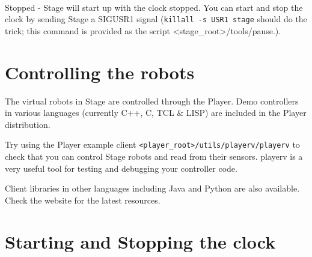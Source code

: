 \documentclass[11pt,twoside]{report}
\newenvironment{xarg}[1]{\noindent{\tt #1}\\\hspace*{2em}\begin{minipage}[t]{5in}}{\end{minipage}\vspace*{1em}}
\begin{document}
    \begin{xarg}{-s} Stopped - Stage will start up with the clock stopped.
      You can start and stop the clock by sending Stage a SIGUSR1 signal
      (\verb'killall -s USR1 stage' should do the trick; this command is
      provided as the script <stage\_root>/tools/pause.).
    \end{xarg}






\section{Controlling the robots}

The virtual robots in Stage are controlled through the Player.  Demo
controllers in various languages (currently C++, C, TCL \& LISP) are
included in the Player distribution.

Try using the Player example client
\verb+<player_root>/utils/playerv/playerv+ to check that you can control
Stage robots and read from their sensors. playerv is a very useful
tool for testing and debugging your controller code.

Client libraries in other languages including Java and Python are also
available. Check the website for the latest resources.

\section{Starting and Stopping the clock}
\end{document}
